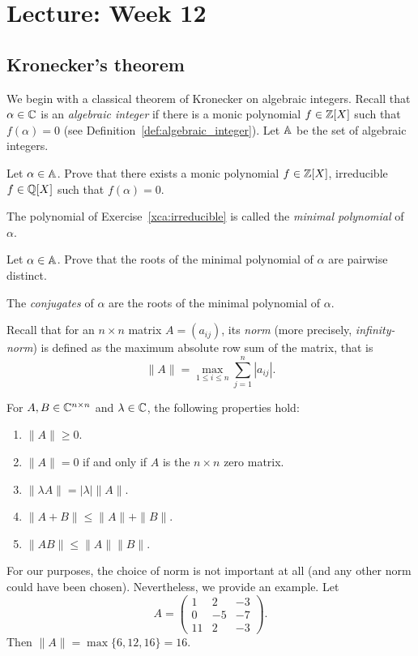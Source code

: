 \section{Lecture: Week 12}

\subsection{Kronecker's theorem}

We begin with a classical theorem of Kronecker on algebraic integers. Recall 
that $\alpha\in\mathbb{C}$ is an \emph{algebraic integer} if there is a monic
polynomial $f\in\mathbb{Z}[X]$ such that $f(\alpha)=0$ (see Definition~\ref{def:algebraic_integer}). Let $\mathbb{A}$ 
be the set of algebraic integers. 

\begin{exercise}
    \label{xca:irreducible}
    Let $\alpha\in\mathbb{A}$. Prove that there exists a monic polynomial $f\in\mathbb{Z}[X]$, 
    irreducible $f\in\mathbb{Q}[X]$ such that $f(\alpha)=0$. 
\end{exercise}

The polynomial of Exercise~\ref{xca:irreducible} is called the \emph{minimal polynomial} of $\alpha$. 

\begin{exercise}
\label{xca:distinct}
    Let $\alpha\in\mathbb{A}$. Prove that the roots of the
    minimal polynomial of $\alpha$ are pairwise distinct. 
\end{exercise}

The \emph{conjugates} of $\alpha$ are the roots of the minimal polynomial of $\alpha$. 

Recall that for an $n\times n$ matrix $A=(a_{ij})$, its \emph{norm} (more precisely, \emph{infinity-norm}) 
is defined 
as the maximum absolute row sum of the matrix, that is 
\[
\|A\|=\max_{1\leq i\leq n}\sum_{j=1}^n|a_{ij}|.
\]

For $A,B\in\mathbb{C}^{n\times n}$ and $\lambda\in\mathbb{C}$, 
the following properties hold: 
\begin{enumerate}
    \item $\|A\|\geq0$.
    \item $\|A\|=0$ if and only if $A$ is the $n\times n$ zero matrix. 
    \item $\|\lambda A\|=|\lambda|\|A\|$. 
    \item $\|A+B\|\leq\|A\|+\|B\|$. 
    \item $\|AB\|\leq\|A\|\|B\|$. 
\end{enumerate}

For our purposes, the choice of norm is not important at all (and any other norm could have been chosen). Nevertheless, we provide an example. Let  
\[
A=\begin{pmatrix}
    1 & 2 & -3\\
    0 &-5 &-7\\
    11 & 2 &-3
\end{pmatrix}.
\]
Then $\|A\|=\max\{6,12,16\}=16$. 

